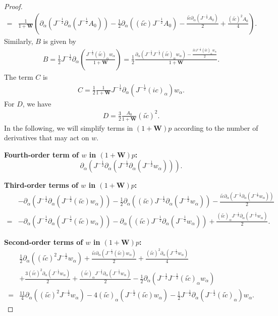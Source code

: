 \documentclass[10pt]{amsart}
\theoremstyle{remark}
\theoremstyle{definition}
\numberwithin{equation}{section}
\newcommand{\p}{\partial}
\newcommand{\al}{\alpha}
\newcommand{\f}{\frac}
\newcommand{\bw}{\mathbf{W}}
\begin{document}
\begin{proof}
\begin{align*}
=&\f{1}{1+\mathbf{W}}\left(\p_{\al}(J^{-\f12}\p_{\al}(J^{-\f12}A_0))-\f12\p_{\al}\left((i\tilde{c})J^{-\f12}A_0\right)-\f{i\tilde{c}\p_{\al}(J^{-\f12}A_0)}{2}+\f{(i\tilde{c})^2A_0}{4}\right).
\end{align*}
Similarly, $B$ is given by
\begin{align*}
B=\f12J^{-\f12}\p_{\al}\left(\f{J^{-\f12}(i\tilde{c})_{\al}w_{\al}}{1+\mathbf{W}}\right)=\f12\f{\p_{\al}(J^{-\f12}J^{-\f12}(i\tilde{c})_{\al}w_{\al})-\f{i\tilde{c}J^{-\f12}(i\tilde{c})_{\al}w_{\al}}{2}}{1+\mathbf{W}}.
\end{align*}
The term $C$ is
\begin{align*}
C=\f12\f{1}{1+\mathbf{W}}J^{-\f12}\p_{\al}\left(J^{-\f12}(ic)_{\al}\right)w_{\al}.
\end{align*}
For $D$, we have
\begin{align*}
D=\f32\f{A_0}{1+\mathbf{W}}(i\tilde{c})^2.
\end{align*}
In the following, we will simplify terms in $(1+\bw)p$ according to the number of derivatives that may act on $w$.

{\bf{Fourth-order term of $w$ in $(1+\mathbf{W})p$}:}
\begin{equation*}
\p_{\al}(J^{-\f12}\p_{\al}(J^{-\f12}\p_{\al}(J^{-\f12}w_{\al}))).   
\end{equation*}

{\bf{Third-order terms of $w$ in $(1+\mathbf{W})p$:}}
\begin{align*}
&-\p_{\al}(J^{-\f12}\p_{\al}(J^{-\f12}(i\tilde{c})w_{\al}))
-\f12\p_{\al}\left((i\tilde{c})J^{-\f12}\p_{\al}(J^{-\f12}w_{\al})\right)
-\f{i\tilde{c}\p_{\al}(J^{-\f12}\p_{\al}(J^{-\f12}w_{\al}))}{2}\\
=&-\p_{\al}(J^{-\f12}\p_{\al}(J^{-\f12}(i\tilde{c})w_{\al}))
-\p_{\al}\left((i\tilde{c})J^{-\f12}\p_{\al}(J^{-\f12}w_{\al})\right)
+\f{(i\tilde{c})_{\al}J^{-\f12}\p_{\al}(J^{-\f12}w_{\al})}{2}.
\end{align*}

{\bf{Second-order terms of $w$ in $(1+\mathbf{W})p$:}}
\begin{align*}
&\f12\p_{\al}\left((i\tilde{c})^2J^{-\f12}w_{\al}\right)+\f{i\tilde{c}\p_{\al}(J^{-\f12}(i\tilde{c})w_{\al})}{2}+\f{(i\tilde{c})^2\p_{\al}(J^{-\f12}w_{\al})}{4}\\
&+\f{3(i\tilde{c})^2\p_{\al}(J^{-\f12}w_{\al})}{2}+\f{(i\tilde{c})_{\al}J^{-\f12}\p_{\al}(J^{-\f12}w_{\al})}{2}-\f12\p_{\al}(J^{-\f12}J^{-\f12}(i\tilde{c})_{\al}w_{\al})\\
=&\f{11}4\p_{\al}\left((i\tilde{c})^2J^{-\f12}w_{\al}\right)-4(i\tilde{c})_{\al}(J^{-\f12}(i\tilde{c})w_{\al})
-\f12J^{-\f12}\p_{\al}(J^{-\f12}(i\tilde{c})_{\al})w_{\al}.
\end{align*}



\end{proof}
\end{document}

